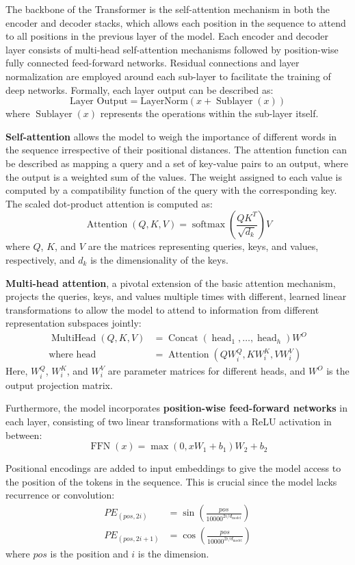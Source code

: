 \documentclass[conference]{IEEEtran}
\begin{document}
The backbone of the Transformer is the self-attention mechanism in both the encoder and decoder stacks, which allows each position in the sequence to attend to all positions in the previous layer of the model. Each encoder and decoder layer consists of multi-head self-attention mechanisms followed by position-wise fully connected feed-forward networks. Residual connections and layer normalization are employed around each sub-layer to facilitate the training of deep networks. Formally, each layer output can be described as:
\[
\text{Layer Output} = \text{LayerNorm}(x + \operatorname{Sublayer}(x))
\]
where $\operatorname{Sublayer}(x)$ represents the operations within the sub-layer itself.

\textbf{Self-attention} allows the model to weigh the importance of different words in the sequence irrespective of their positional distances. The attention function can be described as mapping a query and a set of key-value pairs to an output, where the output is a weighted sum of the values. The weight assigned to each value is computed by a compatibility function of the query with the corresponding key. The scaled dot-product attention is computed as:
\[
\operatorname{Attention}(Q, K, V) = \operatorname{softmax}\left(\frac{QK^T}{\sqrt{d_k}}\right)V
\]
where $Q$, $K$, and $V$ are the matrices representing queries, keys, and values, respectively, and $d_k$ is the dimensionality of the keys.

\textbf{Multi-head attention}, a pivotal extension of the basic attention mechanism, projects the queries, keys, and values multiple times with different, learned linear transformations to allow the model to attend to information from different representation subspaces jointly:
\[
\begin{aligned}
\operatorname{MultiHead}(Q, K, V) &= \operatorname{Concat}(\operatorname{head}_1, \ldots, \operatorname{head}_h) W^O \\
\text{where head} &= \operatorname{Attention}(QW_i^Q, KW_i^K, VW_i^V)
\end{aligned}
\]
Here, $W_i^Q$, $W_i^K$, and $W_i^V$ are parameter matrices for different heads, and $W^O$ is the output projection matrix.

Furthermore, the model incorporates \textbf{position-wise feed-forward networks} in each layer, consisting of two linear transformations with a ReLU activation in between:
\[
\operatorname{FFN}(x) = \max(0, xW_1 + b_1)W_2 + b_2
\]

Positional encodings are added to input embeddings to give the model access to the position of the tokens in the sequence. This is crucial since the model lacks recurrence or convolution:
\[
\begin{aligned}
PE_{(pos, 2i)} &= \sin\left(\frac{pos}{10000^{2i/d_{\text{model}}}}\right) \\
PE_{(pos, 2i+1)} &= \cos\left(\frac{pos}{10000^{2i/d_{\text{model}}}}\right)
\end{aligned}
\]
where $pos$ is the position and $i$ is the dimension.
\end{document}
